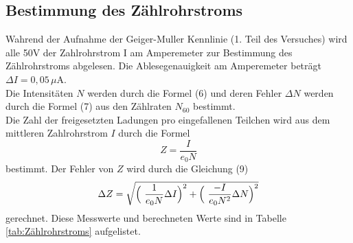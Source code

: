 \subsection{Bestimmung des Zählrohrstroms}
Wahrend  der  Aufnahme  der  Geiger-Muller  Kennlinie (1. Teil des Versuches) wird alle 50V der Zahlrohrstrom I am Amperemeter zur Bestimmung des Zählrohrstroms abgelesen.
Die Ablesegenauigkeit am Amperemeter beträgt \(\Delta I= 0,05\,\mu \text{A}\).\\
Die Intensitäten $N$ werden durch die Formel (6) und deren Fehler $\Delta N$ werden durch die Formel (7) aus den Zählraten $N_{60}$ bestimmt.\\
Die Zahl der freigesetzten Ladungen pro eingefallenen Teilchen wird aus dem mittleren Zahlrohrstrom $I$ durch die Formel 
\begin{equation}
Z= \frac{I}{e_0 N}
\end{equation}
bestimmt.
Der Fehler von $Z$ wird durch die Gleichung (9) 
\begin{align*}
  \Delta Z =\sqrt{\Bigl(\ \frac{1}{e_0N} \Delta I\Bigr)^2+\Bigl(\ \frac{-I}{e_0 N^2} \Delta N \Bigr)^2}
 \end{align*}
gerechnet.
Diese Messwerte und berechneten Werte sind in Tabelle \ref{tab:Zählrohrstroms} aufgelistet.

